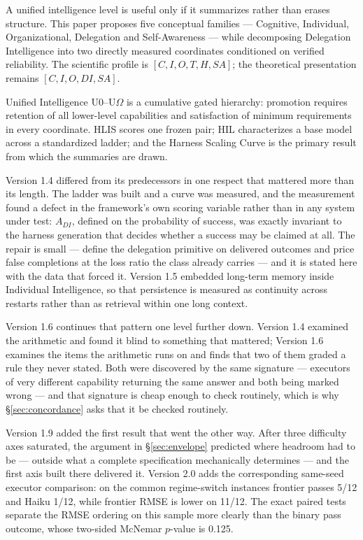 \documentclass[11pt]{article}
\theoremstyle{definition}
\newcommand{\Om}{\ensuremath{\Omega}}
\begin{document}
A unified intelligence level is useful only if it summarizes rather than erases structure. This paper proposes five conceptual families --- Cognitive, Individual, Organizational, Delegation and Self-Awareness --- while decomposing Delegation Intelligence into two directly measured coordinates conditioned on verified reliability. The scientific profile is $[C, I, O, T, H, SA]$; the theoretical presentation remains $[C, I, O, DI, SA]$.

Unified Intelligence U0--U\Om{} is a cumulative gated hierarchy: promotion requires retention of all lower-level capabilities and satisfaction of minimum requirements in every coordinate. HLIS scores one frozen pair; HIL characterizes a base model across a standardized ladder; and the Harness Scaling Curve is the primary result from which the summaries are drawn.

Version 1.4 differed from its predecessors in one respect that mattered more than its length. The ladder was built and a curve was measured, and the measurement found a defect in the framework's own scoring variable rather than in any system under test: $A_{DI}$, defined on the probability of success, was exactly invariant to the harness generation that decides whether a success may be claimed at all. The repair is small --- define the delegation primitive on delivered outcomes and price false completions at the loss ratio the class already carries --- and it is stated here with the data that forced it. Version 1.5 embedded long-term memory inside Individual Intelligence, so that persistence is measured as continuity across restarts rather than as retrieval within one long context.

Version 1.6 continues that pattern one level further down. Version 1.4 examined the arithmetic and found it blind to something that mattered; Version 1.6 examines the items the arithmetic runs on and finds that two of them graded a rule they never stated. Both were discovered by the same signature --- executors of very different capability returning the same answer and both being marked wrong --- and that signature is cheap enough to check routinely, which is why \S\ref{sec:concordance} asks that it be checked routinely.

Version 1.9 added the first result that went the other way. After three difficulty axes saturated, the argument in \S\ref{sec:envelope} predicted where headroom had to be --- outside what a complete specification mechanically determines --- and the first axis built there delivered it. Version 2.0 adds the corresponding same-seed executor comparison: on the common regime-switch instances frontier passes 5/12 and Haiku 1/12, while frontier RMSE is lower on 11/12. The exact paired tests separate the RMSE ordering on this sample more clearly than the binary pass outcome, whose two-sided McNemar $p$-value is 0.125.
\end{document}
